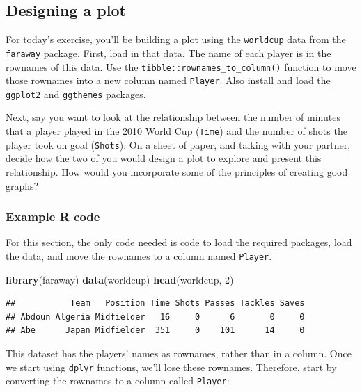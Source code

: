 \documentclass[]{book}
\makeatletter
\newenvironment{Shaded}{\begin{snugshade}}{\end{snugshade}}
\newcommand{\KeywordTok}[1]{\textcolor[rgb]{0.13,0.29,0.53}{\textbf{#1}}}
\newcommand{\DecValTok}[1]{\textcolor[rgb]{0.00,0.00,0.81}{#1}}
\newcommand{\NormalTok}[1]{#1}
\newenvironment{kframe}{%
\medskip{}
\setlength{\fboxsep}{.8em}
 \def\at@end@of@kframe{}%
 \ifinner\ifhmode%
  \def\at@end@of@kframe{\end{minipage}}%
  \begin{minipage}{\columnwidth}%
 \fi\fi%
 \def\FrameCommand##1{\hskip\@totalleftmargin \hskip-\fboxsep
 \colorbox{shadecolor}{##1}\hskip-\fboxsep
     \hskip-\linewidth \hskip-\@totalleftmargin \hskip\columnwidth}%
 \MakeFramed {\advance\hsize-\width
   \@totalleftmargin\z@ \linewidth\hsize
   \@setminipage}}%
 {\par\unskip\endMakeFramed%
 \at@end@of@kframe}
\renewenvironment{Shaded}{\begin{kframe}}{\end{kframe}}
\theoremstyle{definition}
\theoremstyle{definition}
\theoremstyle{definition}
\theoremstyle{remark}
\makeatother
\begin{document}
\subsection{Designing a plot}\label{designing-a-plot}

For today's exercise, you'll be building a plot using the
\texttt{worldcup} data from the \texttt{faraway} package. First, load in
that data. The name of each player is in the rownames of this data. Use
the \texttt{tibble::rownames\_to\_column()} function to move those
rownames into a new column named \texttt{Player}. Also install and load
the \texttt{ggplot2} and \texttt{ggthemes} packages.

Next, say you want to look at the relationship between the number of
minutes that a player played in the 2010 World Cup (\texttt{Time}) and
the number of shots the player took on goal (\texttt{Shots}). On a sheet
of paper, and talking with your partner, decide how the two of you would
design a plot to explore and present this relationship. How would you
incorporate some of the principles of creating good graphs?

\subsubsection{Example R code}\label{example-r-code-6}

For this section, the only code needed is code to load the required
packages, load the data, and move the rownames to a column named
\texttt{Player}.

\begin{Shaded}
\begin{Highlighting}[]
\KeywordTok{library}\NormalTok{(faraway)}
\KeywordTok{data}\NormalTok{(worldcup)}
\KeywordTok{head}\NormalTok{(worldcup, }\DecValTok{2}\NormalTok{)}
\end{Highlighting}
\end{Shaded}

\begin{verbatim}
##           Team   Position Time Shots Passes Tackles Saves
## Abdoun Algeria Midfielder   16     0      6       0     0
## Abe      Japan Midfielder  351     0    101      14     0
\end{verbatim}

This dataset has the players' names as rownames, rather than in a
column. Once we start using \texttt{dplyr} functions, we'll lose these
rownames. Therefore, start by converting the rownames to a column called
\texttt{Player}:
\end{document}
